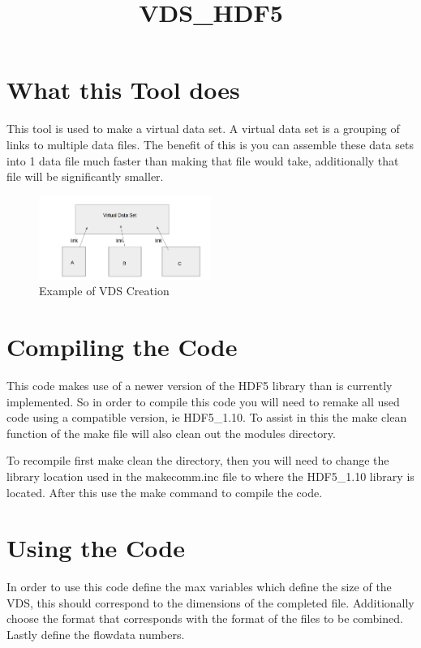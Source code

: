 \documentclass[12pt, oneside]{article}
\title{VDS_HDF5}
\author{}
\begin{document}
\section{What this Tool does}
This tool is used to make a virtual data set. A virtual data set is a grouping of links to multiple data files. 
The benefit of this is you can assemble these data sets into 1 data file much faster than making that file would take, 
additionally that file will be significantly smaller.

\begin{figure}[H]
\centering
\includegraphics[width=0.5\textwidth]{FIGS/VDS_assembly.png}

\caption{{\footnotesize Example of VDS Creation}}
\label{fig: } 
\end{figure}


\section{Compiling the Code}
This code makes use of a newer version of the HDF5 library than is currently implemented. So in order to compile this code you will need to remake all used code
using a compatible version, ie HDF5\_1.10. To assist in this the make clean function of the make file will also clean out the modules directory.

To recompile first make clean the directory, then you will need to change the library location used in the makecomm.inc file to where the HDF5\_1.10 library is located.
After this use the make command to compile the code.

\section{Using the Code}
In order to use this code define the max variables which define the size of the VDS, this should correspond to the dimensions of the completed file.
Additionally choose the format that corresponds with the format of the files to be combined. Lastly define the flowdata numbers.
\end{document}
